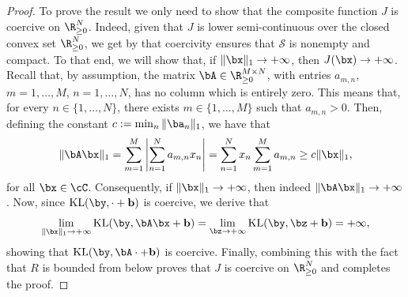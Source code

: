 \documentclass[11pt]{amsart}
\begin{document}
\begin{proof} To prove the result we only need to show that the composite function $J$ is coercive on $\R_{\geq 0}^N$. Indeed, given that $J$ is lower semi-continuous over the closed convex set $\R_{\geq 0}^N$, we get  by \cite[Proposition 11.15]{BCombettes} that coercivity ensures that $\mathcal{S}$ is nonempty and compact. To that end, we will show that, if $\|\bx\|_1\to+\infty$, then $J(\bx)\to+\infty$. Recall that, by assumption, the matrix $\bA\in\R^{M\times N}_{\geq 0}$, with entries $a_{m,n}$, $m=1,\ldots,M$, $n=1,\ldots, N$, has no column which is entirely zero. This means that, for every $n\in\{1,\ldots, N\}$, there exists $m\in\{1,\ldots, M\}$ such that $a_{m,n}>0$. Then,  defining the constant $c := \min_n \|\ba_n\|_1$, we have that 
$$
\|\bA\bx\|_1=\sum_{m=1}^M \left|\sum_{n=1}^N a_{m,n}x_n\right| = \sum_{n=1}^N x_n \sum_{m=1}^M a_{m,n} \geq c\|\bx\|_1,
$$
for all $\bx\in\cC$. Consequently, if $\|\bx\|_1\to+\infty$, then indeed $\|\bA\bx\|_1\to+\infty$. Now, since $\mathrm{KL}(\by,\cdot+\mathbf{b})$ is coercive, we derive that
$$
\lim_{\|\bx\|_1\to+\infty} \mathrm{KL}(\by, \bA\bx+\mathbf{b})=\lim_{\bz\to+\infty}\mathrm{KL}(\by,\bz+\mathbf{b})=+\infty,
$$
showing that $\mathrm{KL}(\by, \bA\cdot+\mathbf{b})$ is coercive. Finally, combining this with the fact that $R$ is bounded from below proves that $J$ is coercive on $\R_{\geq 0}^N$ and completes the proof. 
\end{proof}

\end{document}

